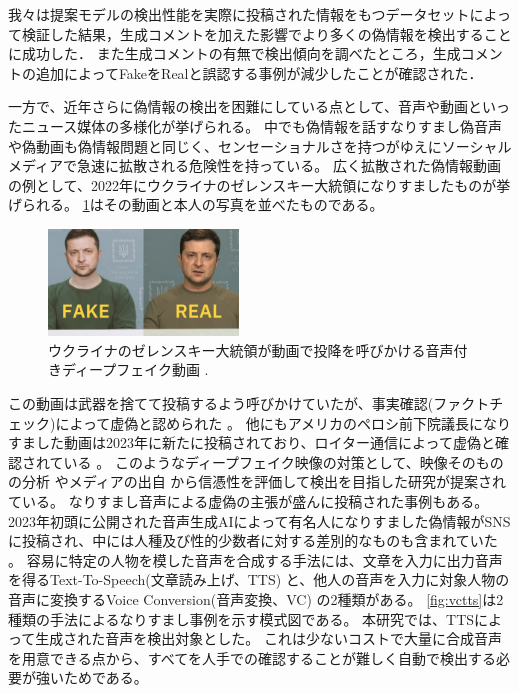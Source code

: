 我々は提案モデルの検出性能を実際に投稿された情報をもつデータセットによって検証した結果，生成コメントを加えた影響でより多くの偽情報を検出することに成功した．
また生成コメントの有無で検出傾向を調べたところ，生成コメントの追加によってFakeをRealと誤認する事例が減少したことが確認された．

一方で、近年さらに偽情報の検出を困難にしている点として、音声や動画といったニュース媒体の多様化が挙げられる。
中でも偽情報を話すなりすまし偽音声や偽動画も偽情報問題と同じく、センセーショナルさを持つがゆえにソーシャルメディアで急速に拡散される危険性を持っている。
広く拡散された偽情報動画の例として、2022年にウクライナのゼレンスキー大統領になりすましたものが挙げられる。
\cref{fig:zelensky}はその動画と本人の写真を並べたものである。
\begin{figure}  %
    \centering
    \includegraphics[width=0.45\textwidth]{figures/zelensky.png}
    \caption{ウクライナのゼレンスキー大統領が動画で投降を呼びかける音声付きディープフェイク動画 \cite{evon_2022}.}
    \label{fig:zelensky}
\end{figure}
この動画は武器を捨てて投稿するよう呼びかけていたが、事実確認(ファクトチェック)によって虚偽と認められた \cite{Staff_2020}。
他にもアメリカのペロシ前下院議長になりすました動画は2023年に新たに投稿されており、ロイター通信によって虚偽と確認されている \cite{Check_2023}。
このようなディープフェイク映像の対策として、映像そのものの分析 \cite{8683164}やメディアの出自 \cite{8668407}から信憑性を評価して検出を目指した研究が提案されている。
なりすまし音声による虚偽の主張が盛んに投稿された事例もある。
2023年初頭に公開された音声生成AIによって有名人になりすました偽情報がSNSに投稿され、中には人種及び性的少数者に対する差別的なものも含まれていた \cite{cox_2023}。
容易に特定の人物を模した音声を合成する手法には、文章を入力に出力音声を得るText-To-Speech(文章読み上げ、TTS) \cite{klatt1987review}と、他人の音声を入力に対象人物の音声に変換するVoice Conversion(音声変換、VC) \cite{661472}の2種類がある。
\cref{fig:vctts}は2種類の手法によるなりすまし事例を示す模式図である。
本研究では、TTSによって生成された音声を検出対象とした。
これは少ないコストで大量に合成音声を用意できる点から、すべてを人手での確認することが難しく自動で検出する必要が強いためである。
